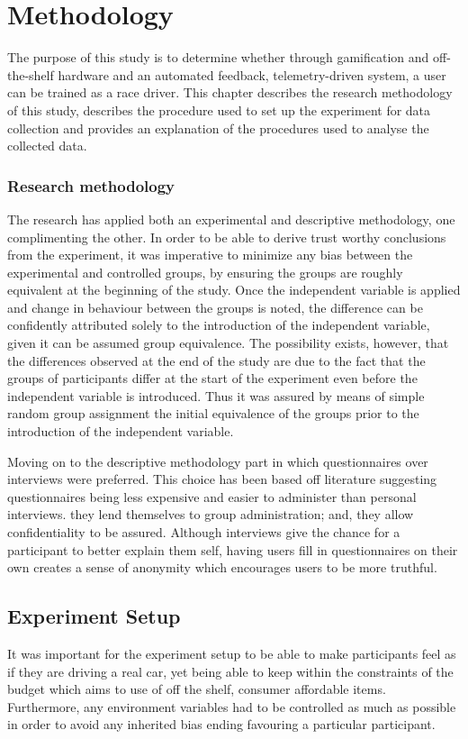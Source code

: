 \section{Methodology}
The purpose of this study is to determine whether through gamification and off-the-shelf hardware and an automated feedback, telemetry-driven system, a user can be trained as a race driver. This chapter describes the research methodology of this study, describes the procedure used to set up the experiment for data collection and provides an explanation of the procedures used to analyse the collected data.

\subsubsection{Research methodology}
The research has applied both an experimental and descriptive methodology, one complimenting the other. In order to be able to derive trust worthy conclusions from the experiment, it was imperative to minimize any bias between the experimental and controlled groups, by ensuring the groups are roughly equivalent at the beginning of the study. Once the independent variable is applied and change in behaviour between the groups is noted, the difference can be confidently attributed solely to the introduction of the independent variable, given it can be assumed group equivalence. The possibility exists, however, that the differences observed at the end of the study are due to the fact that the groups of participants differ at the start of the experiment even before the independent variable is introduced. Thus it was assured by means of simple random group assignment the initial equivalence of the groups prior to the introduction of the independent variable\cite{introductiontobehavioralresearchmethods}.

Moving on to the descriptive methodology part in which questionnaires over interviews were preferred. This choice has been based off literature suggesting questionnaires being less expensive and easier to administer than personal interviews. they lend themselves to group administration; and, they allow confidentiality to be assured. Although interviews give the chance for a participant to better explain them self, having users fill in questionnaires on their own creates a sense of anonymity which encourages users to be more truthful\cite{introductiontobehavioralresearchmethods}. 

\subsection{Experiment Setup}
It was important for the experiment setup to be able to make participants feel as if they are driving a real car, yet being able to keep within the constraints of the budget which aims to use of off the shelf, consumer affordable items. Furthermore, any environment variables had to be controlled as much as possible in order to avoid any inherited bias ending favouring a particular participant.


